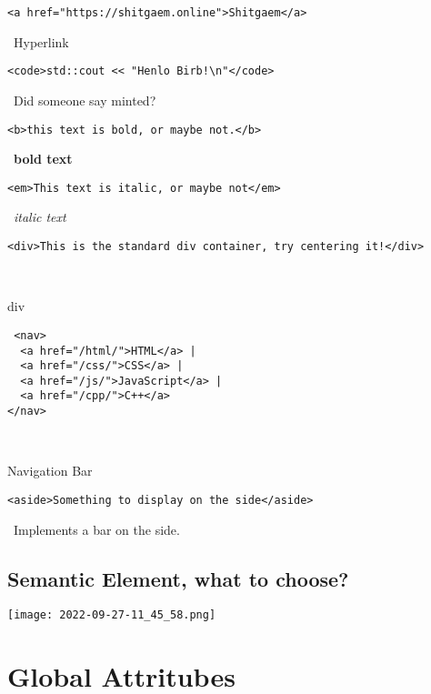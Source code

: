 \documentclass[main.tex,fontsize=6pt,paper=a4,paper=landscape,DIV=calc,]{scrartcl}
\begin{document}
\begin{multicols*}{4}
\begin{lstlisting}
<a href="https://shitgaem.online">Shitgaem</a>
\end{lstlisting}
\, \newline
 Hyperlink

\begin{lstlisting}
<code>std::cout << "Henlo Birb!\n"</code>
\end{lstlisting}
\, \newline
 Did someone say minted?

\begin{lstlisting}
<b>this text is bold, or maybe not.</b>
\end{lstlisting}
\, \newline
 \textbf{bold text}

\begin{lstlisting}
<em>This text is italic, or maybe not</em>
\end{lstlisting}
\, \newline
 \emph{italic text}

\begin{lstlisting}
<div>This is the standard div container, try centering it!</div>
\end{lstlisting}
\, \newline

div


\begin{lstlisting}
 <nav>
  <a href="/html/">HTML</a> |
  <a href="/css/">CSS</a> |
  <a href="/js/">JavaScript</a> |
  <a href="/cpp/">C++</a>
</nav>
\end{lstlisting}
\, \newline

Navigation Bar






\begin{lstlisting}
<aside>Something to display on the side</aside>
\end{lstlisting}
\, \newline
 Implements a bar on the side.



\subsection{Semantic Element, what to choose?}
\texttt{[image: 2022-09-27-11\_45\_58.png]}
\section{Global Attritubes}



\end{multicols*}
\end{document}

